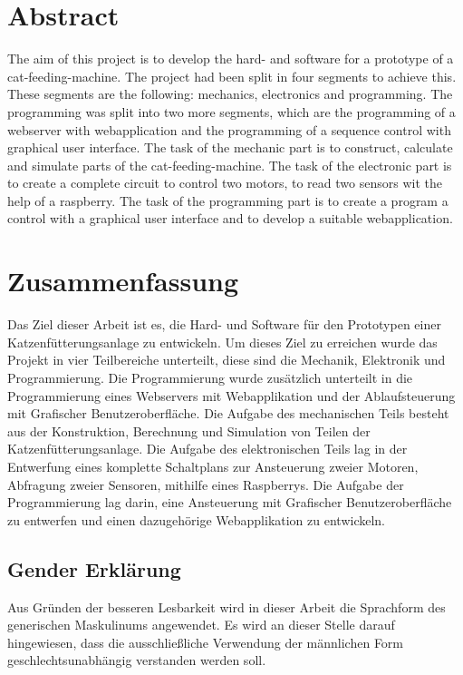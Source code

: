 \clearpage

\newpage
\thispagestyle{empty}
\mbox{}

\clearpage

\section*{Abstract}
\label{sec:abstract}
The aim of this project is to develop the hard- and software for a prototype of a cat-feeding-machine. The project had been split in four segments to achieve this. These segments are the following: mechanics, electronics and programming. The programming was split into two more segments, which are the programming of a webserver with webapplication and the programming of a sequence control with graphical user interface. The task of the mechanic part is to construct, calculate and simulate parts of the cat-feeding-machine. The task of the electronic part is to create a complete circuit to control two motors, to read two sensors wit the help of a raspberry. The task of the programming part is to create a program a control with a graphical user interface and to develop a suitable webapplication.

\section*{Zusammenfassung}
Das Ziel dieser Arbeit ist es, die Hard- und Software für den Prototypen einer Katzenfütterungsanlage zu entwickeln.
Um dieses Ziel zu erreichen wurde das Projekt in vier Teilbereiche unterteilt, diese sind die Mechanik, Elektronik
und Programmierung. Die Programmierung wurde zusätzlich unterteilt in die Programmierung eines Webservers mit Webapplikation und  der Ablaufsteuerung mit Grafischer Benutzeroberfläche. Die Aufgabe des mechanischen Teils besteht aus der Konstruktion, Berechnung und Simulation von Teilen der Katzenfütterungsanlage. Die Aufgabe des elektronischen Teils lag in der Entwerfung eines komplette Schaltplans zur Ansteuerung zweier Motoren, Abfragung zweier Sensoren, mithilfe eines Raspberrys. Die Aufgabe der Programmierung lag darin, eine Ansteuerung mit Grafischer Benutzeroberfläche zu entwerfen und einen dazugehörige Webapplikation zu entwickeln.

\clearpage

\newpage
\thispagestyle{empty}
\mbox{}

\clearpage

\subsection*{Gender Erklärung}
\label{sec:gender-erklaerung}
Aus Gründen der besseren Lesbarkeit wird in dieser Arbeit die Sprachform des generischen Maskulinums angewendet. Es wird an dieser Stelle darauf hingewiesen, dass die ausschließliche Verwendung der männlichen Form geschlechtsunabhängig verstanden werden soll.

